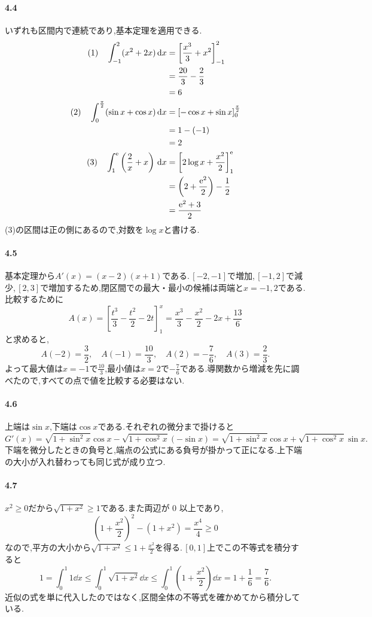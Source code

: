\paragraph{4.4}
いずれも区間内で連続であり,基本定理を適用できる.
\begin{align*}
 \text{(1)}\quad\int_{-1}^2(x^2+2x)\,\mathrm{d} x
 &=\left[\frac{x^3}{3}+x^2\right]_{-1}^2\\
 &=\frac{20}{3}-\frac23\\
 &=6\\
 \text{(2)}\quad\int_0^{\frac\pi2}(\sin x+\cos x)\,\mathrm{d} x
 &=[-\cos x+\sin x]_0^{\frac\pi2}\\
 &=1-(-1)\\
 &=2\\
 \text{(3)}\quad\int_1^{\mathrm{e}}\left(\frac2x+x\right)\,\mathrm{d} x
 &=\left[2\log x+\frac{x^2}{2}\right]_1^{\mathrm{e}}\\
 &=\left(2+\frac{\mathrm{e}^2}{2}\right)-\frac12\\
 &=\frac{\mathrm{e}^2+3}{2}
\end{align*}
(3)の区間は正の側にあるので,対数を$\log x$と書ける.

\paragraph{4.5}
基本定理から$A'(x)=(x-2)(x+1)$である.\,$[-2,-1]$で増加,\,$[-1,2]$で減少,\,$[2,3]$で増加するため,閉区間での最大・最小の候補は両端と$x=-1,2$である.比較するために
\[
 A(x)=\left[\frac{t^3}{3}-\frac{t^2}{2}-2t\right]_1^x
 =\frac{x^3}{3}-\frac{x^2}{2}-2x+\frac{13}{6}
\]
と求めると,
\[
 A(-2)=\frac32,\quad A(-1)=\frac{10}{3},\quad
 A(2)=-\frac76,\quad A(3)=\frac23.
\]
よって最大値は$x=-1$で$\frac{10}{3}$,最小値は$x=2$で$-\frac76$である.導関数から増減を先に調べたので,すべての点で値を比較する必要はない.

\paragraph{4.6}
上端は$\sin x$,下端は$\cos x$である.それぞれの微分まで掛けると
\[
 G'(x)=\sqrt{1+\sin^2x}\cos x
       -\sqrt{1+\cos^2x}(-\sin x)
 =\sqrt{1+\sin^2x}\cos x+\sqrt{1+\cos^2x}\sin x.
\]
下端を微分したときの負号と,端点の公式にある負号が掛かって正になる.上下端の大小が入れ替わっても同じ式が成り立つ.

\paragraph{4.7}
$x^2\ge0$だから$\sqrt{1+x^2}\ge1$である.また両辺が $0$ 以上であり,
\[
 \left(1+\frac{x^2}{2}\right)^2-(1+x^2)=\frac{x^4}{4}\ge0
\]
なので,平方の大小から$\sqrt{1+x^2}\le1+\frac{x^2}{2}$を得る.\,$[0,1]$上でこの不等式を積分すると
\[
 1=\int_0^1 1\dd x
 \le\int_0^1\sqrt{1+x^2}\dd x
 \le\int_0^1\left(1+\frac{x^2}{2}\right)\dd x
 =1+\frac16=\frac76.
\]
近似の式を単に代入したのではなく,区間全体の不等式を確かめてから積分している.

